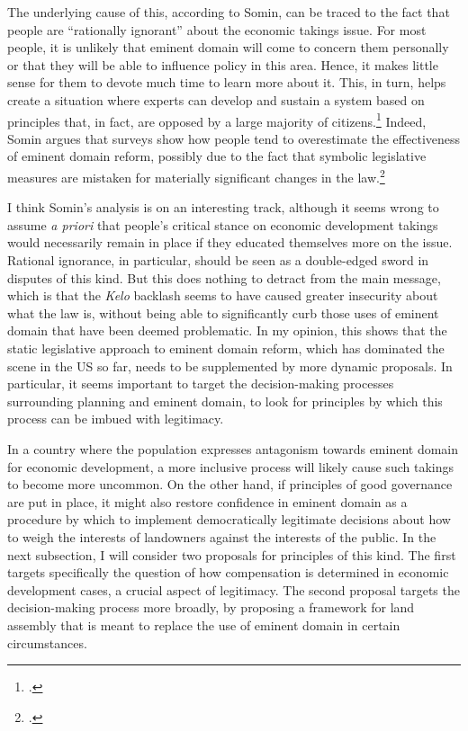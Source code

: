 The underlying cause of this, according to Somin, can be traced to the fact that people are ``rationally ignorant'' about the economic takings issue. For most people, it is unlikely that eminent domain will come to concern them personally or that they will be able to influence policy in this area. Hence, it makes little sense for them to devote much time to learn more about it. This, in turn, helps create a situation where experts can develop and sustain a system based on principles that, in fact, are opposed by a large majority of citizens.\footcite[2163-2171]{somin09} Indeed, Somin argues that surveys show how people tend to overestimate the effectiveness of eminent domain reform, possibly due to the fact that symbolic legislative measures are mistaken for materially significant changes in the law.\footcite{somin09}

I think Somin's analysis is on an interesting track, although it seems wrong to assume {\it a priori} that people's critical stance on economic development takings would necessarily remain in place if they educated themselves more on the issue. Rational ignorance, in particular, should be seen as a double-edged sword in disputes of this kind. But this does nothing to detract from the main message, which is that the {\it Kelo} backlash seems to have caused greater insecurity about what the law is, without being able to significantly curb those uses of eminent domain that have been deemed problematic. In my opinion, this shows that the static legislative approach to eminent domain reform, which has dominated the scene in the US so far, needs to be supplemented by more dynamic proposals. In particular, it seems important to target the decision-making processes surrounding planning and eminent domain, to look for principles by which this process can be imbued with legitimacy. 

In a country where the population expresses antagonism towards eminent domain for economic development, a more inclusive process will likely cause such takings to become more uncommon. On the other hand, if principles of good governance are put in place, it might also restore confidence in eminent domain as a procedure by which to implement democratically legitimate decisions about how to weigh the interests of landowners against the interests of the public. In the next subsection, I will consider two proposals for principles of this kind. The first targets specifically the question of how compensation is determined in economic development cases, a crucial aspect of legitimacy. The second proposal targets the decision-making process more broadly, by proposing a framework for land assembly that is meant to replace the use of eminent domain in certain circumstances.

